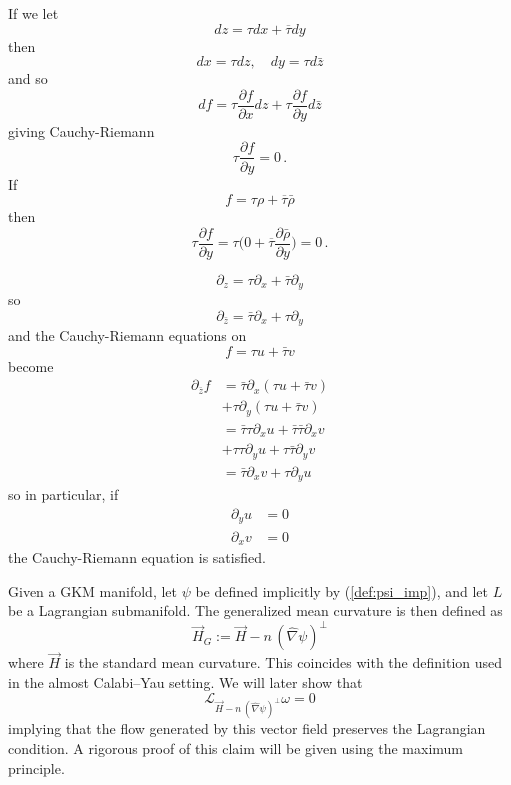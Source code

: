 \documentclass[12pt,letterpaper]{amsart}%
\numberwithin{mycounter}{section}
\theoremstyle{plain}
\numberwithin{equation}{section}
\theoremstyle{definition}
\begin{document}
{If we let 
\begin{equation*}
    dz=\tau dx+\overline{\tau}dy
\end{equation*}
then
\begin{equation*}
    dx=\tau dz, \quad dy=\tau d\bar{z}
\end{equation*}
and so
\begin{equation*}
    df = \tau \frac{\partial f}{\partial x}dz+\tau \frac{\partial f}{\partial y}d\bar{z}
\end{equation*}
giving Cauchy-Riemann
\begin{equation*}
    \tau \frac{\partial f}{\partial y}=0\,.
\end{equation*}
If 
\begin{equation*}
    f=\tau\rho+\overline{\tau}\bar{\rho}
\end{equation*}
then
\begin{equation*}
    \tau \frac{\partial f}{\partial y} = \tau \Big(0+\overline{\tau}\frac{\partial \bar{\rho}}{\partial y}\Big)=0\,.
\end{equation*}


\bigskip

\[
\partial_{z}=\tau\partial_{x}+\bar{\tau}\partial_{y}%
\]
so
\[
\partial_{\bar{z}}=\bar{\tau}\partial_{x}+\tau\partial_{y}%
\]
and the Cauchy-Riemann equations on
\[
f=\tau u+\bar{\tau}v
\]
become
\begin{align*}
\partial_{\bar{z}}f  & =\bar{\tau}\partial_{x}\left(  \tau u+\bar{\tau
}v\right)  \\
& +\tau\partial_{y}\left(  \tau u+\bar{\tau}v\right)  \\
& =\bar{\tau}\tau\partial_{x}u+\bar{\tau}\bar{\tau}\partial_{x}v\\
& +\tau\tau\partial_{y}u+\tau\bar{\tau}\partial_{y}v\\
& =\bar{\tau}\partial_{x}v+\tau\partial_{y}u
\end{align*}
so in particular, if
\begin{align*}
\partial_{y}u  & =0\\
\partial_{x}v  & =0
\end{align*}
the Cauchy-Riemann equation is satisfied. }

\bigskip
\fi
 
Given a GKM manifold, let $\psi$ be defined implicitly by (\ref{def:psi_imp}), and let $L$ be a Lagrangian submanifold. The generalized mean curvature is then defined as
\[
\vec{H}_G := \vec{H} - n\, (\hat\nabla \psi)^\perp
\]
where $\vec{H}$ is the standard mean curvature. 
This coincides with the definition used in the almost Calabi–Yau setting. We will later show that
\[
\mathcal{L}_{\vec{H} - n\, (\hat{\nabla} \psi)^\perp} \omega = 0
\]
implying that the flow generated by this vector field preserves the Lagrangian condition. A rigorous proof of this claim will be given using the maximum principle.
\end{document}
